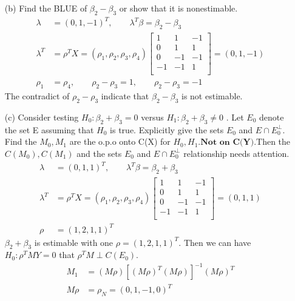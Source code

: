 \begin{itemize}
\item[(b)] Find the BLUE of $\beta_2 - \beta_3$ or show that it is nonestimable.
\begin{align*}
    \lambda &= (0, 1,-1)^T, \qquad \lambda^T \beta = \beta_2 - \beta_3\\
    \lambda^T &= \rho^T X = (\rho_1, \rho_2, \rho_3, \rho_4)  \begin{bmatrix}
           1  & 1 & -1  \\
           0 &  1 & 1\\
           0  & -1 & -1  \\
           -1 &  -1 & 1\\
         \end{bmatrix} = (0, 1,-1)\\
         \rho_1 &= \rho_4, \qquad \rho_2 - \rho_3 = 1, \qquad \rho_2 - \rho_3 = -1
\end{align*}
The contradict of $\rho_2 - \rho_3$ indicate that  $\beta_2 - \beta_3$ is not estimable.
\item[(c)] Consider testing $H_0: \beta_2 + \beta_3 = 0$  versus $H_1: \beta_2 + \beta_3 \neq 0$ . Let $E_0$ denote the set E assuming that $H_0$ is true. Explicitly give the sets $E_0$ and $E \cap E_0^{\perp}$.\\
Find the $M_{0}, M_{1}$ are the o.p.o onto C(X) for $H_0, H_1$.$\textbf{Not on C(Y)}$.Then the $C(M_{0}), C(M_{1})$ and the sets $E_0$ and $E \cap E_0^{\perp}$ relationship needs attention.
\begin{align*}
    \lambda &= (0, 1, 1)^T, \qquad \lambda^T \beta = \beta_2 + \beta_3\\
    \lambda^T &= \rho^T X = (\rho_1, \rho_2, \rho_3, \rho_4)  \begin{bmatrix}
           1  & 1 & -1  \\
           0 &  1 & 1\\
           0  & -1 & -1  \\
           -1 &  -1 & 1\\
         \end{bmatrix} = (0, 1, 1)\\
         \rho &= (1, 2, 1, 1)^T
\end{align*}
$ \beta_2 + \beta_3$ is estimable with one $\rho = (1, 2, 1, 1)^T$. Then we can have $H_0: \rho^T M Y = 0$ that $\rho^T M \perp C(E_0)$. 
\begin{align*}
    M_1 &= ( M\rho) [(M\rho)^T ( M\rho)]^{-1} ( M\rho)^T\\
    M\rho &=  \rho_N= (0, 1, -1, 0)^T \\

\end{align*}
\end{itemize}
